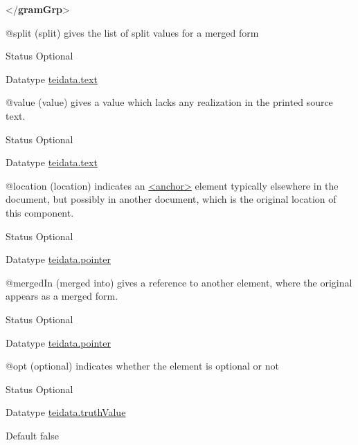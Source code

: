 \begin{reflist}
\begin{sansreflist}
\begin{reflist}
{</\textbf{gramGrp}>}
\end{reflist}  
    \item[@split]
  (split) gives the list of split values for a merged form
\begin{reflist}
    \item[{Status}]
  Optional
    \item[{Datatype}]
  \hyperref[TEI.teidata.text]{teidata.text}
\end{reflist}  
    \item[@value]
  (value) gives a value which lacks any realization in the printed source text.
\begin{reflist}
    \item[{Status}]
  Optional
    \item[{Datatype}]
  \hyperref[TEI.teidata.text]{teidata.text}
\end{reflist}  
    \item[@location]
  (location) indicates an \hyperref[TEI.anchor]{<anchor>} element typically elsewhere in the document, but possibly in another document, which is the original location of this component.
\begin{reflist}
    \item[{Status}]
  Optional
    \item[{Datatype}]
  \hyperref[TEI.teidata.pointer]{teidata.pointer}
\end{reflist}  
    \item[@mergedIn]
  (merged into) gives a reference to another element, where the original appears as a merged form.
\begin{reflist}
    \item[{Status}]
  Optional
    \item[{Datatype}]
  \hyperref[TEI.teidata.pointer]{teidata.pointer}
\end{reflist}  
    \item[@opt]
  (optional) indicates whether the element is optional or not
\begin{reflist}
    \item[{Status}]
  Optional
    \item[{Datatype}]
  \hyperref[TEI.teidata.truthValue]{teidata.truthValue}
    \item[{Default}]
  false
\end{reflist}  
\end{sansreflist}  
\end{reflist}  
